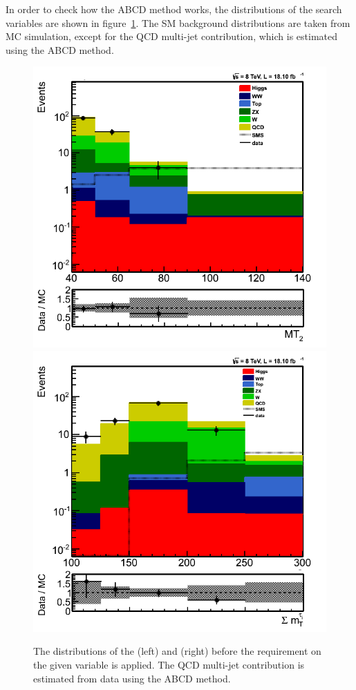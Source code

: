 In order to check how the ABCD method works, the distributions of the search variables are shown in 
figure~\ref{fig:5QCDbg}. The SM background distributions are taken from MC simulation, except for 
the QCD multi-jet contribution, which is estimated using the ABCD method.
\begin{figure}[iHhtb]
\centering
\includegraphics[angle=0,scale=0.35]{QCDbginTauTau/Bin1_QCDestimation.png}
\includegraphics[angle=0,scale=0.35]{QCDbginTauTau/Bin2_QCDestimation.png}
\caption{The distributions of the \mttwo (left) and \SumMT (right) before the requirement on the given variable
is applied. The QCD multi-jet contribution is estimated from data using the ABCD method.}
\label{fig:5QCDbg}
\end{figure}

